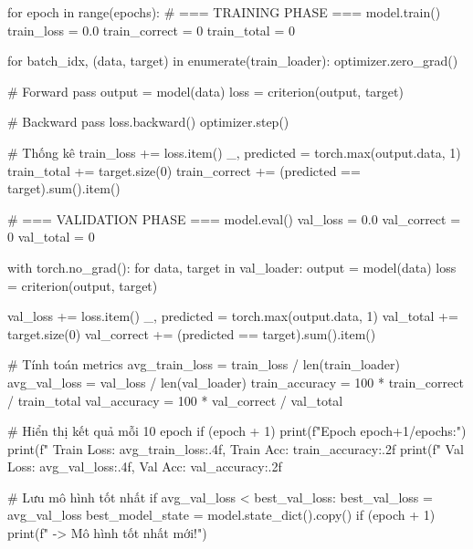\begin{aivncodebox}
\begin{python}
        for epoch in range(epochs):
            # === TRAINING PHASE ===
            model.train()
            train_loss = 0.0
            train_correct = 0
            train_total = 0
            
            for batch_idx, (data, target) in enumerate(train_loader):
                optimizer.zero_grad()
                
                # Forward pass
                output = model(data)
                loss = criterion(output, target)
                
                # Backward pass
                loss.backward()
                optimizer.step()
                
                # Thống kê
                train_loss += loss.item()
                _, predicted = torch.max(output.data, 1)
                train_total += target.size(0)
                train_correct += (predicted == target).sum().item()
            
            # === VALIDATION PHASE ===
            model.eval()
            val_loss = 0.0
            val_correct = 0
            val_total = 0
            
            with torch.no_grad():
                for data, target in val_loader:
                    output = model(data)
                    loss = criterion(output, target)
                    
                    val_loss += loss.item()
                    _, predicted = torch.max(output.data, 1)
                    val_total += target.size(0)
                    val_correct += (predicted == target).sum().item()
            
            # Tính toán metrics
            avg_train_loss = train_loss / len(train_loader)
            avg_val_loss = val_loss / len(val_loader)
            train_accuracy = 100 * train_correct / train_total
            val_accuracy = 100 * val_correct / val_total
            
            # Hiển thị kết quả mỗi 10 epoch
            if (epoch + 1) %
                print(f"Epoch {epoch+1}/{epochs}:")
                print(f"  Train Loss: {avg_train_loss:.4f}, Train Acc: {train_accuracy:.2f}%
                print(f"  Val Loss: {avg_val_loss:.4f}, Val Acc: {val_accuracy:.2f}%
            
            # Lưu mô hình tốt nhất
            if avg_val_loss < best_val_loss:
                best_val_loss = avg_val_loss
                best_model_state = model.state_dict().copy()
                if (epoch + 1) %
                    print(f"  -> Mô hình tốt nhất mới!")
        

\end{python}
\end{aivncodebox}
